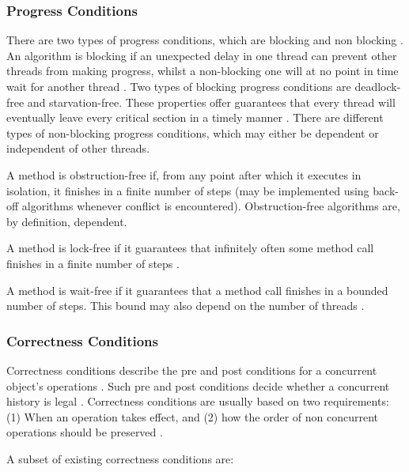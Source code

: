 \documentclass[a4paper, 12pt, titlepage]{article}
\begin{document}
\begin{onehalfspacing}
\subsubsection{Progress Conditions}
There are two types of progress conditions, which are blocking and non blocking \cite[Chapter~3.7]{herlihy2020art}. An algorithm is blocking if an unexpected delay in one thread can prevent other threads from making progress, whilst a non-blocking one will at no point in time wait for another thread \cite[Chapter~3.7]{herlihy2020art}. Two types of blocking progress conditions are deadlock-free and starvation-free. These properties offer guarantees that every thread will eventually leave every critical section in a timely manner \cite[Chapter~3.7.1]{herlihy2020art}. There are different types of non-blocking progress conditions, which may either be dependent or independent of other threads. 

A method is obstruction-free if, from any point after which it executes in isolation, it finishes in a finite number of steps (may be implemented using back-off algorithms whenever conflict is encountered)\cite{herlihy2020art,herlihy2003obstruction}. Obstruction-free algorithms are, by definition, dependent.

A method is lock-free if it guarantees that infinitely often some method call finishes in a finite number of steps \cite{herlihy2020art}.

A method is wait-free if it guarantees that a method call finishes in a bounded number of steps. This bound may also depend on the number of threads \cite{herlihy2020art}.

\subsubsection{Correctness Conditions}

Correctness conditions describe the pre and post conditions for a concurrent object's operations \cite{herlihy2020art}. Such pre and post conditions decide whether a concurrent history is legal \cite{herlihy1990linearizability}. Correctness conditions are usually based on two requirements: (1) When an operation takes effect, and (2) how the order of non concurrent operations should be preserved \cite{herlihy1990linearizability}.

A subset of existing correctness conditions are:


\end{onehalfspacing}
\end{document}
